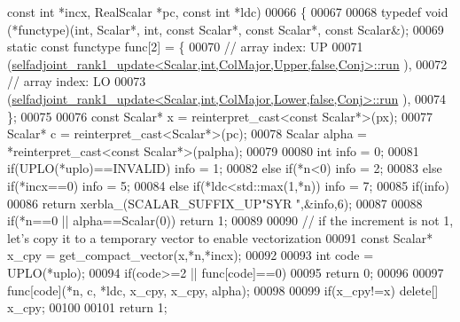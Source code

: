 \begin{DoxyCode}
{      const} \textcolor{keywordtype}{int} *incx, RealScalar *pc, \textcolor{keyword}{const} \textcolor{keywordtype}{int} *ldc)
00066 \{
00067 
00068   \textcolor{keyword}{typedef} void (*functype)(int, Scalar*, int, \textcolor{keyword}{const} Scalar*, \textcolor{keyword}{const} Scalar*, \textcolor{keyword}{const} Scalar&);
00069   \textcolor{keyword}{static} \textcolor{keyword}{const} functype func[2] = \{
00070     \textcolor{comment}{// array index: UP}
00071     (\hyperlink{struct_eigen_1_1selfadjoint__rank1__update}{selfadjoint\_rank1\_update<Scalar,int,ColMajor,Upper,false,Conj>::run}
      ),
00072     \textcolor{comment}{// array index: LO}
00073     (\hyperlink{struct_eigen_1_1selfadjoint__rank1__update}{selfadjoint\_rank1\_update<Scalar,int,ColMajor,Lower,false,Conj>::run}
      ),
00074   \};
00075 
00076   \textcolor{keyword}{const} Scalar* x = \textcolor{keyword}{reinterpret\_cast<}\textcolor{keyword}{const }Scalar*\textcolor{keyword}{>}(px);
00077   Scalar* c = \textcolor{keyword}{reinterpret\_cast<}Scalar*\textcolor{keyword}{>}(pc);
00078   Scalar alpha = *\textcolor{keyword}{reinterpret\_cast<}\textcolor{keyword}{const }Scalar*\textcolor{keyword}{>}(palpha);
00079 
00080   \textcolor{keywordtype}{int} info = 0;
00081   \textcolor{keywordflow}{if}(UPLO(*uplo)==INVALID)                                            info = 1;
00082   \textcolor{keywordflow}{else} \textcolor{keywordflow}{if}(*n<0)                                                       info = 2;
00083   \textcolor{keywordflow}{else} \textcolor{keywordflow}{if}(*incx==0)                                                   info = 5;
00084   \textcolor{keywordflow}{else} \textcolor{keywordflow}{if}(*ldc<std::max(1,*n))                                        info = 7;
00085   \textcolor{keywordflow}{if}(info)
00086     \textcolor{keywordflow}{return} xerbla\_(SCALAR\_SUFFIX\_UP\textcolor{stringliteral}{"SYR  "},&info,6);
00087 
00088   \textcolor{keywordflow}{if}(*n==0 || alpha==Scalar(0)) \textcolor{keywordflow}{return} 1;
00089 
00090   \textcolor{comment}{// if the increment is not 1, let's copy it to a temporary vector to enable vectorization}
00091   \textcolor{keyword}{const} Scalar* x\_cpy = get\_compact\_vector(x,*n,*incx);
00092 
00093   \textcolor{keywordtype}{int} code = UPLO(*uplo);
00094   \textcolor{keywordflow}{if}(code>=2 || func[code]==0)
00095     \textcolor{keywordflow}{return} 0;
00096 
00097   func[code](*n, c, *ldc, x\_cpy, x\_cpy, alpha);
00098 
00099   \textcolor{keywordflow}{if}(x\_cpy!=x)  \textcolor{keyword}{delete}[] x\_cpy;
00100 
00101   \textcolor{keywordflow}{return} 1;

\end{DoxyCode}
